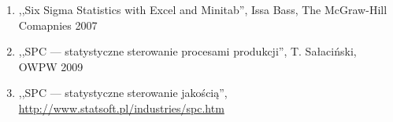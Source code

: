 \begin{enumerate}
\item ,,Six Sigma Statistics with Excel and Minitab'', Issa Bass, The McGraw-Hill Comapnies 2007
\item ,,SPC --- statystyczne sterowanie procesami produkcji'', T. Sałaciński, OWPW 2009 
\item ,,SPC --- statystyczne
sterowanie jakością'', \url{http://www.statsoft.pl/industries/spc.htm}

\end{enumerate}

